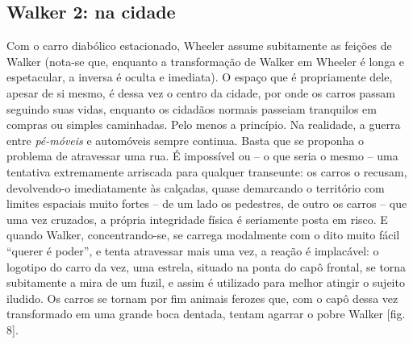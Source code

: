 \begin{multicols}{2}
\section*{Walker 2:\allowbreak{} na cidade}
\par{}Com o carro diabólico estacionado,\allowbreak{} Wheeler assume subitamente as feições de Walker (\allowbreak{}nota-\allowbreak{}se que,\allowbreak{} enquanto a transformação de Walker em Wheeler é longa e espetacular,\allowbreak{} a inversa é oculta e imediata)\allowbreak{}.\allowbreak{} O espaço que é propriamente dele,\allowbreak{} apesar de si mesmo,\allowbreak{} é dessa vez o centro da cidade,\allowbreak{} por onde os carros passam seguindo suas vidas,\allowbreak{} enquanto os cidadãos normais passeiam tranquilos em compras ou simples caminhadas.\allowbreak{} Pelo menos a princípio.\allowbreak{} Na realidade,\allowbreak{} a guerra entre \textit{pé-\allowbreak{}móveis} e automóveis sempre continua.\allowbreak{} Basta que se proponha o problema de atravessar uma rua.\allowbreak{} É impossível ou – o que seria o mesmo – uma tentativa extremamente arriscada para qualquer transeunte:\allowbreak{} os carros o recusam,\allowbreak{} devolvendo-\allowbreak{}o imediatamente às calçadas,\allowbreak{} quase demarcando o território com limites espaciais muito fortes – de um lado os pedestres,\allowbreak{} de outro os carros – que uma vez cruzados,\allowbreak{} a própria integridade física é seriamente posta em risco.\allowbreak{} E quando Walker,\allowbreak{} concentrando-\allowbreak{}se,\allowbreak{} se carrega modalmente com o dito muito fácil “querer é poder”,\allowbreak{} e tenta atravessar mais uma vez,\allowbreak{} a reação é implacável:\allowbreak{} o logotipo do carro da vez,\allowbreak{} uma estrela,\allowbreak{} situado na ponta do capô frontal,\allowbreak{} se torna subitamente a mira de um fuzil,\allowbreak{} e assim é utilizado para melhor atingir o sujeito iludido.\allowbreak{} Os carros se tornam por fim animais ferozes que,\allowbreak{} com o capô dessa vez transformado em uma grande boca dentada,\allowbreak{} tentam agarrar o pobre Walker [fig.\allowbreak{} 8].\allowbreak{}
\par
{
}
\end{multicols}
